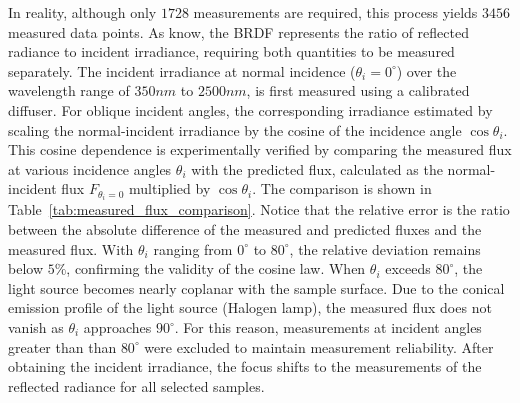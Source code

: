 In reality, although only $1728$ measurements are required, this process yields $3456$ measured data points.
As know, the BRDF represents the ratio of reflected radiance to incident irradiance, requiring both quantities to be measured separately.
The incident irradiance at normal incidence ($\theta_i = 0^\circ$) over the wavelength range of $350 nm$ to $2500 nm$, is first measured using a calibrated diffuser.
For oblique incident angles, the corresponding irradiance estimated by scaling the normal-incident irradiance by the cosine of the incidence angle $\cos\theta_i$.
This cosine dependence is experimentally verified by comparing the measured flux at various incidence angles $\theta_i$ with the predicted flux, calculated as the normal-incident flux $F_{\theta_i=0}$ multiplied by $\cos\theta_i$.
The comparison is shown in Table~\ref{tab:measured_flux_comparison}.
Notice that the relative error is the ratio between the absolute difference of the measured and predicted fluxes and the measured flux.
With $\theta_i$ ranging from $0^\circ$ to $80^\circ$, the relative deviation remains below $5\%$, confirming the validity of the cosine law.
When $\theta_i$ exceeds $80^\circ$, the light source becomes nearly coplanar with the sample surface.
Due to the conical emission profile of the light source (Halogen lamp), the measured flux does not vanish as $\theta_i$ approaches $90^\circ$.
For this reason, measurements at incident angles greater than than $80^\circ$ were excluded to maintain measurement reliability.
After obtaining the incident irradiance, the focus shifts to the measurements of the reflected radiance for all selected samples.



